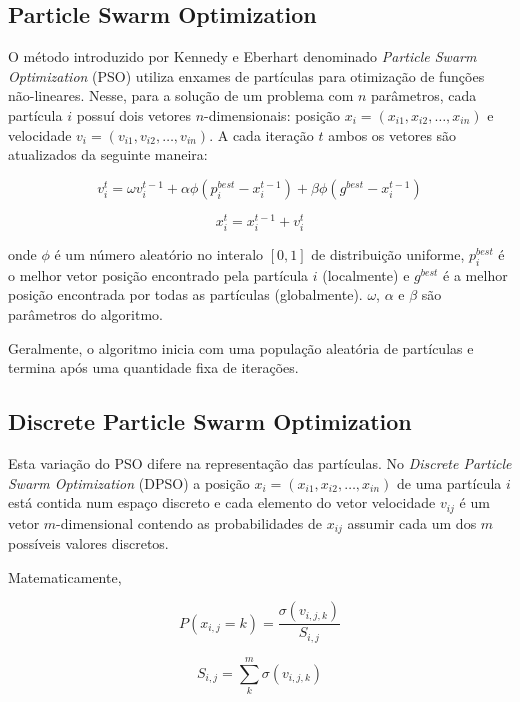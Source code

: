 \subsection{Particle Swarm Optimization}

O método introduzido por Kennedy e Eberhart \cite{kennedy1995pso} denominado \textit{Particle Swarm Optimization} (PSO) utiliza enxames de partículas para otimização de funções não-lineares. Nesse, para a solução de um problema com $n$ parâmetros, cada partícula $i$ possuí dois vetores $n$-dimensionais: posição $x_{i} = (x_{i1}, x_{i2}, \dots, x_{in})$ e velocidade $v_{i} = (v_{i1}, v_{i2}, \dots, v_{in})$. A cada iteração $t$ ambos os vetores são atualizados da seguinte maneira:

\begin{equation}
v_{i}^{t} = \omega v_{i}^{t-1} + \alpha \phi (p_{i}^{best} - x_{i}^{t-1}) + \beta \phi (g^{best} - x_{i}^{t-1})
\end{equation}

\begin{equation}
x_{i}^{t} = x_{i}^{t-1} + v_{i}^{t}
\end{equation}

onde $\phi$ é um número aleatório no interalo $[0,1]$ de distribuição uniforme, $p_{i}^{best}$ é o melhor vetor posição encontrado pela partícula $i$ (localmente) e $g^{best}$ é a melhor posição encontrada por todas as partículas (globalmente). $\omega$, $\alpha$ e $\beta$ são parâmetros do algoritmo.

Geralmente, o algoritmo inicia com uma população aleatória de partículas e termina após uma quantidade fixa de iterações.

\subsection{Discrete Particle Swarm Optimization}

Esta variação do PSO difere na representação das partículas. No \textit{Discrete Particle Swarm Optimization} (DPSO) a posição $x_{i} = (x_{i1}, x_{i2}, \dots, x_{in})$ de uma partícula $i$ está contida num espaço discreto e cada elemento do vetor velocidade $v_{ij}$ é um vetor $m$-dimensional contendo as probabilidades de $x_{ij}$ assumir cada um dos $m$ possíveis valores discretos.

Matematicamente,

\noindent\begin{minipage}{.5\linewidth}
$$
P(x_{i,j} = k) = \frac{\sigma (v_{i,j,k})}{S_{i,j}}
$$
\end{minipage}%
\begin{minipage}{.5\linewidth}
$$
S_{i,j} = \sum_{k}^{m} \sigma(v_{i,j,k})
$$
\end{minipage}\\

